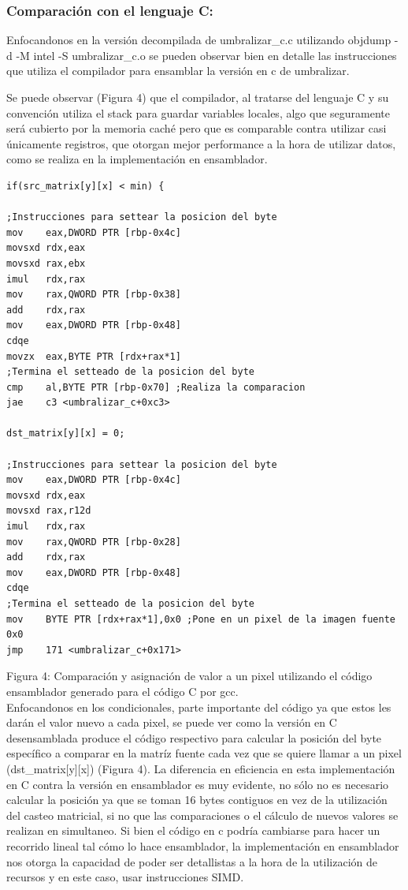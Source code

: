 \subsubsection{Comparación con el lenguaje C:}
Enfocandonos en la versión decompilada de umbralizar\_c.c utilizando objdump -d -M intel -S umbralizar\_c.o se pueden observar bien en detalle las instrucciones que utiliza el compilador para ensamblar la versión en c de umbralizar.

Se puede observar (Figura 4) que el compilador, al tratarse del lenguaje C y su convención utiliza el stack para guardar variables locales, algo que seguramente será cubierto por la memoria caché pero que es comparable contra utilizar casi únicamente registros, que otorgan mejor performance a la hora de utilizar datos, como se realiza en la implementación en ensamblador.
\begin{lstlisting}
if(src_matrix[y][x] < min) {

;Instrucciones para settear la posicion del byte
mov    eax,DWORD PTR [rbp-0x4c]
movsxd rdx,eax
movsxd rax,ebx
imul   rdx,rax
mov    rax,QWORD PTR [rbp-0x38]
add    rdx,rax
mov    eax,DWORD PTR [rbp-0x48]
cdqe   
movzx  eax,BYTE PTR [rdx+rax*1]
;Termina el setteado de la posicion del byte
cmp    al,BYTE PTR [rbp-0x70] ;Realiza la comparacion
jae    c3 <umbralizar_c+0xc3>

dst_matrix[y][x] = 0;

;Instrucciones para settear la posicion del byte
mov    eax,DWORD PTR [rbp-0x4c]
movsxd rdx,eax
movsxd rax,r12d
imul   rdx,rax
mov    rax,QWORD PTR [rbp-0x28]
add    rdx,rax
mov    eax,DWORD PTR [rbp-0x48]
cdqe   
;Termina el setteado de la posicion del byte
mov    BYTE PTR [rdx+rax*1],0x0 ;Pone en un pixel de la imagen fuente 0x0
jmp    171 <umbralizar_c+0x171>
\end{lstlisting}

Figura 4: Comparación y asignación de valor a un pixel utilizando el código  ensamblador generado para el código C por gcc. \\

Enfocandonos en los condicionales, parte importante del código ya que estos les darán el valor nuevo a cada pixel, se puede ver como la versión en C desensamblada produce el código respectivo para calcular la posición del byte específico a comparar en la matríz fuente cada vez que se quiere llamar a un pixel (dst\_matrix[y][x]) (Figura 4). La diferencia en eficiencia en esta implementación en C contra la versión en ensamblador es muy evidente, no sólo no es necesario calcular la posición ya que se toman 16 bytes contiguos en vez de la utilización del casteo matricial, si no que las comparaciones o el cálculo de nuevos valores se realizan en simultaneo. Si bien el código en c podría cambiarse para hacer un recorrido lineal tal cómo lo hace ensamblador, la implementación en ensamblador nos otorga la capacidad de poder ser detallistas a la hora de la utilización de recursos y en este caso, usar instrucciones SIMD.

